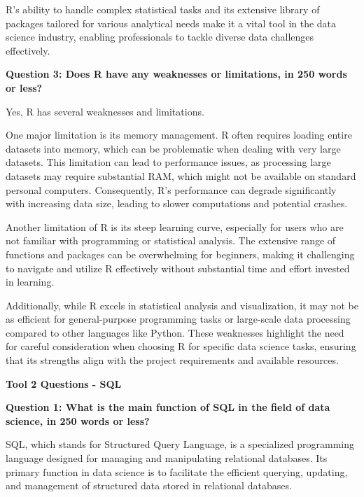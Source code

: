 \documentclass[a4paper, 11pt]{report}
\begin{document}
R's ability to handle complex statistical tasks and its extensive library of packages tailored for various analytical needs make it a vital tool in the data science industry, enabling professionals to tackle diverse data challenges effectively.

\vspace{\baselineskip}

\textbf{Question 3: Does R have any weaknesses or limitations, in 250 words or less?}

Yes, R has several weaknesses and limitations.

One major limitation is its memory management. R often requires loading entire datasets into memory, which can be problematic when dealing with very large datasets. This limitation can lead to performance issues, as processing large datasets may require substantial RAM, which might not be available on standard personal computers. Consequently, R's performance can degrade significantly with increasing data size, leading to slower computations and potential crashes.

Another limitation of R is its steep learning curve, especially for users who are not familiar with programming or statistical analysis. The extensive range of functions and packages can be overwhelming for beginners, making it challenging to navigate and utilize R effectively without substantial time and effort invested in learning.

Additionally, while R excels in statistical analysis and visualization, it may not be as efficient for general-purpose programming tasks or large-scale data processing compared to other languages like Python. These weaknesses highlight the need for careful consideration when choosing R for specific data science tasks, ensuring that its strengths align with the project requirements and available resources.

\vspace{\baselineskip}

\textbf{\large{Tool 2 Questions - SQL}}

\textbf{Question 1: What is the main function of SQL in the field of data science, in 250 words or less?}

SQL, which stands for Structured Query Language, is a specialized programming language designed for managing and manipulating relational databases. Its primary function in data science is to facilitate the efficient querying, updating, and management of structured data stored in relational databases.
\end{document}
